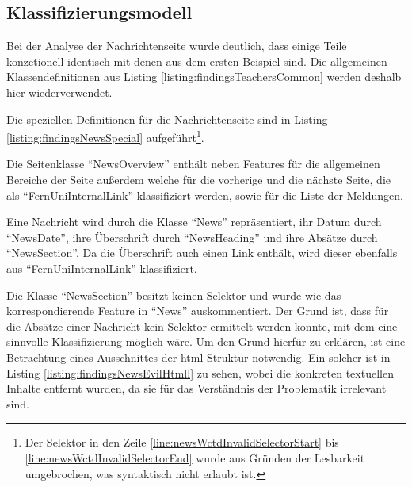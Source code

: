 \subsection{Klassifizierungsmodell}
    \label{section:findingsNewsClasses}
    Bei der Analyse der Nachrichtenseite wurde deutlich,
    dass einige Teile konzetionell identisch mit denen aus dem ersten Beispiel sind.
    Die allgemeinen Klassendefinitionen aus Listing \ref{listing:findingsTeachersCommon}
    werden deshalb hier wiederverwendet.

    Die speziellen Definitionen für die Nachrichtenseite sind in
    Listing \ref{listing:findingsNewsSpecial}
    aufgeführt\footnote{Der Selektor in den Zeile \ref{line:newsWctdInvalidSelectorStart}
    bis \ref{line:newsWctdInvalidSelectorEnd} wurde aus Gründen der Lesbarkeit umgebrochen,
    was syntaktisch nicht erlaubt ist.}.

    

    Die Seitenklasse "`NewsOverview"' enthält neben Features für die
    allgemeinen Bereiche der Seite außerdem welche für die vorherige und die nächste
    Seite, die als "`FernUniInternalLink"' klassifiziert werden,
    sowie für die Liste der Meldungen.

    Eine Nachricht wird durch die Klasse "`News"' repräsentiert,
    ihr Datum durch "`NewsDate"', ihre Überschrift durch "`NewsHeading"'
    und ihre Absätze durch "`NewsSection"'.
    Da die Überschrift auch einen Link enthält,
    wird dieser ebenfalls aus "`FernUniInternalLink"' klassifiziert.

    Die Klasse "`NewsSection"' besitzt keinen Selektor und wurde wie das
    korrespondierende Feature in "`News"' auskommentiert.
    Der Grund ist, dass für die Absätze einer Nachricht kein Selektor ermittelt werden konnte,
    mit dem eine sinnvolle Klassifizierung möglich wäre.
    Um den Grund hierfür zu erklären, ist eine Betrachtung eines
    Ausschnittes der \gls{html}-Struktur notwendig.
    Ein solcher ist in Listing \ref{listing:findingsNewsEvilHtmll}
    zu sehen, wobei die konkreten textuellen Inhalte entfernt wurden,
    da sie für das Verständnis der Problematik irrelevant sind.

    

